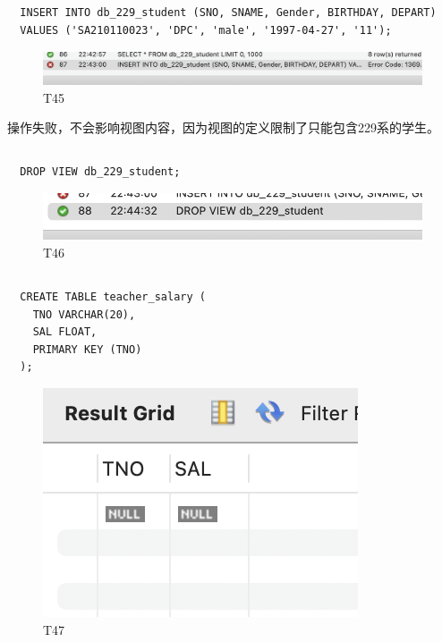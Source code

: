 \documentclass[UTF8]{ctexart}
\begin{document}
\subsection{}
\begin{lstlisting}
  INSERT INTO db_229_student (SNO, SNAME, Gender, BIRTHDAY, DEPART)
  VALUES ('SA210110023', 'DPC', 'male', '1997-04-27', '11');
\end{lstlisting}
\begin{figure}[H]
  \centering
  \includegraphics[scale=0.7]{pics/45.png}
  \caption*{T45}
\end{figure}
操作失败，不会影响视图内容，因为视图的定义限制了只能包含229系的学生。

\subsection{}
\begin{lstlisting}
  DROP VIEW db_229_student;
\end{lstlisting}
\begin{figure}[H]
  \centering
  \includegraphics[scale=0.7]{pics/46.png}
  \caption*{T46}
\end{figure}

\subsection{}
\begin{lstlisting}
  CREATE TABLE teacher_salary (
    TNO VARCHAR(20),
    SAL FLOAT,
    PRIMARY KEY (TNO)
  );
\end{lstlisting}
\begin{figure}[H]
  \centering
  \includegraphics[scale=0.7]{pics/47.png}
  \caption*{T47}
\end{figure}
\end{document}

